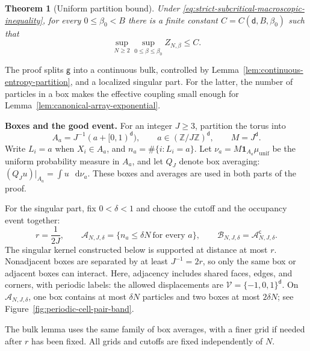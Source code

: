 \documentclass[11pt,reqno]{amsart}
\numberwithin{equation}{section}
\theoremstyle{plain}
\newtheorem{thm}{Theorem}[section]
\theoremstyle{definition}
\renewcommand{\d}{\mathsf d}
\newcommand{\dd}{\mathop{}\!\mathrm d}
\newcommand{\Z}{\mathbb Z}
\newcommand{\one}{\mathbf 1}
\newcommand{\be}{\beta}
\newcommand{\g}{\mathsf g}
\newcommand{\muunif}{\mu_{\mathrm{unif}}}
\begin{document}
\begin{thm}[Uniform partition bound]
\label{thm:principal}
Under \eqref{eq:strict-subcritical-macroscopic-inequality}, for every $0\le\be_0<B$ there is a finite constant $C=C(\d,B,\be_0)$ such that
\begin{equation}
 \sup_{N\ge2}\sup_{0\le\be\le\be_0}Z_{N,\be}\le C.
 \label{eq:principal-order-one}
\end{equation}
\end{thm}

The proof splits $\g$ into a continuous bulk, controlled by Lemma~\ref{lem:continuous-entropy-partition}, and a localized singular part.  For the latter, the number of particles in a box makes the effective coupling small enough for Lemma~\ref{lem:canonical-array-exponential}.

\textbf{Boxes and the good event.}
For an integer $J\ge3$, partition the torus into
\begin{equation}
 A_a=J^{-1}(a+[0,1)^\d),\qquad
 a\in(\Z/J\Z)^\d,\qquad M=J^\d.
 \label{eq:common-box-partition}
\end{equation}
Write $L_i=a$ when $X_i\in A_a$, and $n_a=\#\{i:L_i=a\}$.
Let $\nu_a=M\one_{A_a}\muunif$ be the uniform probability measure in $A_a$, and let $Q_J$ denote box averaging: $(Q_Ju)|_{A_a}=\int u\,\dd\nu_a$.
These boxes and averages are used in both parts of the proof.

For the singular part, fix $0<\delta<1$ and choose the cutoff and the occupancy event together:
\begin{equation}
 r=\frac1{2J},\qquad
 \mathcal A_{N,J,\delta}=\{n_a\le\delta N\ \text{for every }a\},
 \qquad
 \mathcal B_{N,J,\delta}=\mathcal A_{N,J,\delta}^{\mathsf c}.
 \label{eq:physical-neighbor-events}
\end{equation}
The singular kernel constructed below is supported at distance at most $r$.
Nonadjacent boxes are separated by at least $J^{-1}=2r$, so only the same box or adjacent boxes can interact.  Here, adjacency includes shared faces, edges, and corners, with periodic labels: the allowed displacements are
$\mathcal V=\{-1,0,1\}^\d$.
On $\mathcal A_{N,J,\delta}$, one box contains at most $\delta N$ particles and two boxes at most $2\delta N$; see Figure~\ref{fig:periodic-cell-pair-band}.

The bulk lemma uses the same family of box averages, with a finer grid if needed after $r$ has been fixed.  All grids and cutoffs are fixed independently of $N$.
\end{document}
